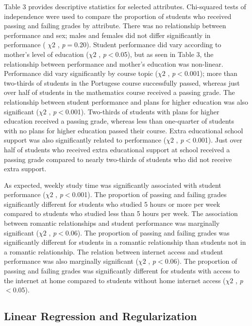 \documentclass[sigconf]{acmart}
\begin{document}
Table 3 provides descriptive statistics for selected attributes. Chi-squared 
tests of independence were used to compare the proportion of students who 
received passing and failing grades by attribute. There was no relationship
between performance and sex; males and females did not differ significantly 
in performance ( $\chi 2$ , \textit{p}$=$0.20). Student performance did vary
according to mother's level of education ($\chi 2$ , \textit{p}$<$0.05), but 
as seen in Table 3, the relationship between performance and mother's 
education was non-linear. Performance did vary significantly by course 
topic ($\chi 2$ , \textit{p}$<$0.001); more than two-thirds of students in 
the Portugese course successfully passed, whereas just over half of students 
in the mathematics course received a passing grade. The relationship between 
student performance and plans for higher education was also significant 
($\chi 2$ , \textit{p}$<$0.001). Two-thirds of students with plans for 
higher education received a passing grade, whereas less than one-quarter of 
students with no plans for higher education passed their course. Extra 
educational school support was also significantly related to performance 
($\chi 2$ , \textit{p}$<$0.001). Just over half of students who received 
extra educational support at school received a passing grade compared to 
nearly two-thirds of students who did not receive extra support. 

As expected, weekly study time was significantly associated with student 
performance ($\chi 2$ , \textit{p}$<$0.001). The proportion of passing and 
failing grades significantly different for students who studied 5 hours or 
more per week compared to students who studied less than 5 hours per week. 
The association between romantic relationships and student performance 
was marginally significant ($\chi 2$ , \textit{p}$<$0.06). The proportion 
of passing and failing grades was significantly different for students in 
a romantic relationship than students not in a romantic relationship. The 
relation between internet access and student performance was also marginally 
significant ($\chi 2$ , \textit{p}$<$0.06). The proportion of passing and
failing grades was significantly different for students with access to the 
internet at home compared to students without home internet access 
($\chi 2$ , \textit{p}$<$0.05).


\subsection{Linear Regression and Regularization}
\end{document}
